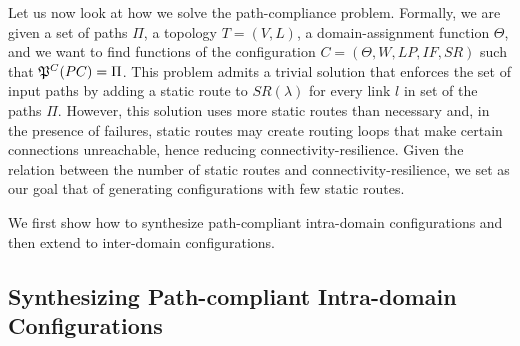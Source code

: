Let us now look at how we solve the path-compliance problem.
Formally, we are given a set of paths $\Pi$,
a topology $T=(V,L)$,
a domain-assignment function $\Theta$, 
and we want to find functions of the configuration
$C=(\Theta,W,LP,IF,SR)$ such that
$\mathfrak{P}^C(PC) = \Pi$.
This problem admits a trivial solution that 
enforces the set of input paths
 by adding a 
static route to $SR(\lambda)$ for every link $l$ in 
set of the paths $\Pi$. 
However, this solution uses more static routes than necessary
and, in the presence of failures, static routes may
create routing loops that make certain connections 
unreachable, hence reducing connectivity-resilience.
Given the relation between the number of static 
routes and connectivity-resilience,
we set as our goal that of generating configurations 
with few static routes.


We first show how to synthesize 
path-compliant intra-domain 
configurations and then extend to
 inter-domain configurations.



\subsection{Synthesizing Path-compliant Intra-domain Configurations} \label{sec:intra-synthesis}

